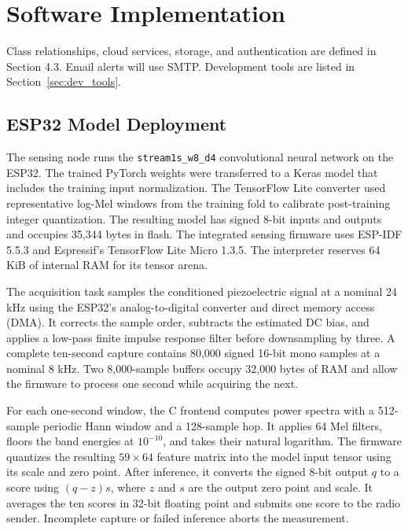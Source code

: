 \documentclass[12pt,a4paper,oneside]{memoir}
\newcommand{\newrevision}[1]{#1}
\begin{document}


\section{Software Implementation}
\label{sec:SoftwareImplementation}


\newrevision{Class relationships, cloud services, storage, and authentication are defined in Section 4.3. Email alerts will use SMTP. Development tools are listed in Section~\ref{sec:dev_tools}.}

\subsection{\newrevision{ESP32 Model Deployment}}
\label{sec:esp32_deployment}

\newrevision{The sensing node runs the \texttt{stream1s\_w8\_d4} convolutional neural network on the ESP32. The trained PyTorch weights were transferred to a Keras model that includes the training input normalization. The TensorFlow Lite converter used representative log-Mel windows from the training fold to calibrate post-training integer quantization. The resulting model has signed 8-bit inputs and outputs and occupies 35,344 bytes in flash. The integrated sensing firmware uses ESP-IDF 5.5.3 and Espressif's TensorFlow Lite Micro 1.3.5. The interpreter reserves 64 KiB of internal RAM for its tensor arena.}

\newrevision{The acquisition task samples the conditioned piezoelectric signal at a nominal 24 kHz using the ESP32's analog-to-digital converter and direct memory access (DMA). It corrects the sample order, subtracts the estimated DC bias, and applies a low-pass finite impulse response filter before downsampling by three. A complete ten-second capture contains 80,000 signed 16-bit mono samples at a nominal 8 kHz. Two 8,000-sample buffers occupy 32,000 bytes of RAM and allow the firmware to process one second while acquiring the next.}

\newrevision{For each one-second window, the C frontend computes power spectra with a 512-sample periodic Hann window and a 128-sample hop. It applies 64 Mel filters, floors the band energies at $10^{-10}$, and takes their natural logarithm. The firmware quantizes the resulting $59 \times 64$ feature matrix into the model input tensor using its scale and zero point. After inference, it converts the signed 8-bit output $q$ to a score using $(q-z)s$, where $z$ and $s$ are the output zero point and scale. It averages the ten scores in 32-bit floating point and submits one score to the radio sender. Incomplete capture or failed inference aborts the measurement.}
\end{document}

